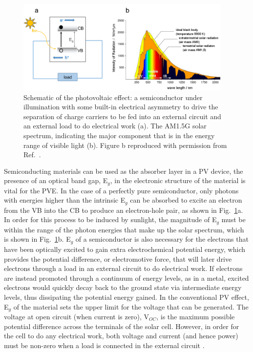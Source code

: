 \documentclass[11pt, twoside]{report}
\begin{document}
\begin{figure}[h!]
  \centering
    \includegraphics[width=0.95\textwidth]{figures/PV_schematic.png}
    \caption[Schematic of the photovoltaic effect: a semiconductor under illumination with some built-in electrical asymmetry to drive the separation of charge carriers to be fed into an external circuit and an external load to do electrical work (a). The AM1.5G solar spectrum, indicating the major component that is in the energy range of visible light (b).]{Schematic of the photovoltaic effect: a semiconductor under illumination with some built-in electrical asymmetry to drive the separation of charge carriers to be fed into an external circuit and an external load to do electrical work (a). The AM1.5G solar spectrum, indicating the major component that is in the energy range of visible light (b). Figure b reproduced with permission from Ref.~.}
  \label{PV_schematic}
\end{figure}

Semiconducting materials can be used as the absorber layer in a PV device, the presence of an optical band gap, E$_g$, in the electronic structure of the material is vital for the PVE. In the case of a perfectly pure semiconductor, only photons with energies higher than the intrinsic E$_g$ can be absorbed to excite an electron from the VB into the CB to produce an electron-hole pair, as shown in Fig.~\ref{PV_schematic}a. In order for this process to be induced by sunlight, the magnitude of E$_g$ must be within the range of the photon energies that make up the solar spectrum, which is shown in Fig.~\ref{PV_schematic}b. E$_g$ of a semiconductor is also necessary for the electrons that have been optically excited to gain extra electrochemical potential energy, which provides the potential difference, or electromotive force, that will later drive electrons through a load in an external circuit to do electrical work. If electrons are instead promoted through a continuum of energy levels, as in a metal, excited electrons would quickly decay back to the ground state via intermediate energy levels, thus dissipating the potential energy gained. In the conventional PV effect, E$_g$ of the material sets the upper limit for the voltage that can be generated. The voltage at open circuit (when current is zero), V$_{OC}$, is the maximum possible potential difference across the terminals of the solar cell. However, in order for the cell to do any electrical work, both voltage and current (and hence power) must be non-zero when a load is connected in the external circuit \cite{Nelson3}.
\end{document}
